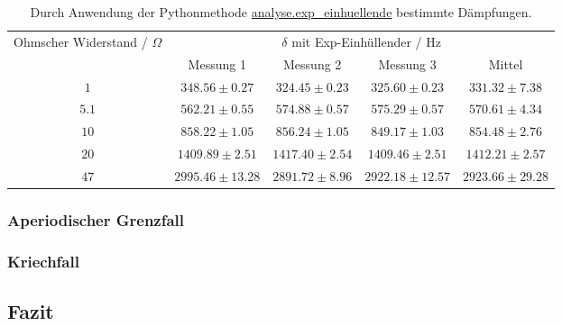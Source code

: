 \documentclass[a4paper, 12pt]{scrartcl}
\begin{document}
\begin{table}[H]
\centering
\begin{adjustbox}{width=\textwidth}
\begin{tabular}{c|cccc}
\multirow{2}{*}{Ohmscher Widerstand / $\Omega$} & \multicolumn{4}{c}{$\delta$ mit Exp-Einhüllender / Hz} \\
\cline{2-5}
& Messung 1 & Messung 2 & Messung 3 & Mittel\\
\hline
$1$ & $348.56 \pm 0.27$ & $324.45\pm 0.23$ & $325.60\pm 0.23$ & $331.32\pm 7.38$ \\
$5.1$ & $562.21 \pm 0.55$ & $574.88\pm 0.57$ & $575.29\pm 0.57$ & $570.61\pm 4.34$ \\
$10$ & $858.22 \pm 1.05$ & $856.24\pm 1.05$ & $849.17\pm 1.03$ & $854.48\pm 2.76$ \\
$20$ & $1409.89 \pm 2.51$ & $1417.40\pm 2.54$ & $1409.46\pm 2.51$ & $1412.21\pm 2.57$ \\
$47$ & $2995.46 \pm 13.28$ & $2891.72\pm 8.96$ & $2922.18\pm 12.57$ & $2923.66\pm 29.28$
\end{tabular}
\end{adjustbox}
\caption{Durch Anwendung der Pythonmethode \url{analyse.exp_einhuellende} bestimmte Dämpfungen.}
\label{tab:daempfung2}
\end{table}



\subsubsection{Aperiodischer Grenzfall}

\subsubsection{Kriechfall}



\subsection{Fazit}


\newpage




\newpage
\appendix
\end{document}
